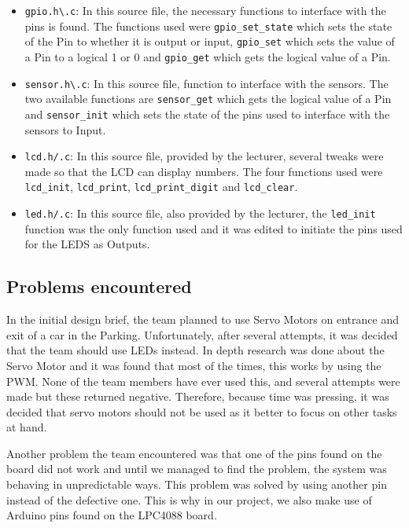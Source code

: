 \documentclass[11pt,a4paper,twocolumn]{article}
\begin{document}
\begin{itemize}
	\item \verb|gpio.h\.c|: In this source file, the necessary functions to interface with the pins is found. The functions used were \verb|gpio_set_state| which sets the state of the Pin to whether it is output or input, \verb|gpio_set| which sets the value of a Pin to a logical 1 or 0 and \verb|gpio_get| which gets the logical value of a Pin.
	
	\item \verb|sensor.h\.c|: In this source file, function to interface with the sensors. The two available functions are \verb|sensor_get| which gets the logical value of a Pin and \verb|sensor_init| which sets the state of the pins used to interface with the sensors to Input. 
	
	\item \verb|lcd.h/.c|: In this source file, provided by the lecturer, several tweaks were made so that the LCD can display numbers. The four functions used were \verb|lcd_init|, \verb|lcd_print|, \verb|lcd_print_digit| and \verb|lcd_clear|.
	
	\item \verb|led.h/.c|: In this source file, also provided by the lecturer, the \verb|led_init| function was the only function used and it was edited to initiate the pins used for the LEDS as Outputs. 
\end{itemize}

\subsection{Problems encountered}

In the initial design brief, the team planned to use Servo Motors on entrance and exit of a car in the Parking. Unfortunately, after several attempts, it was decided that the team should use LEDs instead. In depth research was done about the Servo Motor and it was found that most of the times, this works by using the PWM. None of the team members have ever used this, and several attempts were made but these returned negative. Therefore, because time was pressing, it was decided that servo motors should not be used as it better to focus on other tasks at hand.
 
Another problem the team encountered was that one of the pins found on the board did not work and until we managed to find the problem, the system was behaving in unpredictable ways. This problem was solved by using another pin instead of the defective one. This is why in our project, we also make use of Arduino pins found on the LPC4088 board. 
\end{document}
